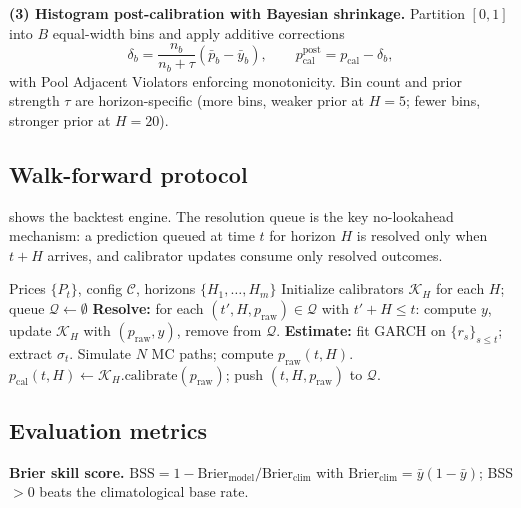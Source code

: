\documentclass[11pt,a4paper]{article}
\newcommand{\pcal}{p_{\text{cal}}}
\newcommand{\praw}{p_{\text{raw}}}
\begin{document}
\textbf{(3) Histogram post-calibration with Bayesian shrinkage.} Partition $[0, 1]$ into $B$ equal-width bins and apply additive corrections
\begin{equation}
  \delta_b = \frac{n_b}{n_b + \tau}(\bar{p}_b - \bar{y}_b), \qquad \pcal^{\text{post}} = \pcal - \delta_b,
  \label{eq:histogram}
\end{equation}
with Pool Adjacent Violators enforcing monotonicity. Bin count and prior strength $\tau$ are horizon-specific (more bins, weaker prior at $H\!=\!5$; fewer bins, stronger prior at $H\!=\!20$).

\subsection{Walk-forward protocol}

 shows the backtest engine. The resolution queue is the key no-lookahead mechanism: a prediction queued at time $t$ for horizon $H$ is resolved only when $t+H$ arrives, and calibrator updates consume only resolved outcomes.

\begin{algorithm}[htbp]
\caption{Walk-forward backtest with resolution queue}
\label{alg:walkforward}
\begin{algorithmic}[1]
\REQUIRE Prices $\{P_t\}$, config $\mathcal{C}$, horizons $\{H_1, \ldots, H_m\}$
\STATE Initialize calibrators $\mathcal{K}_H$ for each $H$; queue $\mathcal{Q} \leftarrow \emptyset$
  \STATE \textbf{Resolve:} for each $(t', H, \praw) \in \mathcal{Q}$ with $t' + H \leq t$: compute $y$, update $\mathcal{K}_H$ with $(\praw, y)$, remove from $\mathcal{Q}$.
  \STATE \textbf{Estimate:} fit GARCH on $\{r_s\}_{s \leq t}$; extract $\sigma_t$.
    \STATE Simulate $N$ MC paths; compute $\praw(t, H)$.
    \STATE $\pcal(t, H) \leftarrow \mathcal{K}_H.\text{calibrate}(\praw)$; push $(t, H, \praw)$ to $\mathcal{Q}$.
  \ENDFOR
\ENDFOR
\end{algorithmic}
\end{algorithm}

\subsection{Evaluation metrics}
\label{sec:metrics}

\textbf{Brier skill score.} $\text{BSS} = 1 - \text{Brier}_\text{model} / \text{Brier}_\text{clim}$ with $\text{Brier}_\text{clim} = \bar{y}(1-\bar{y})$; BSS $> 0$ beats the climatological base rate.
\end{document}

